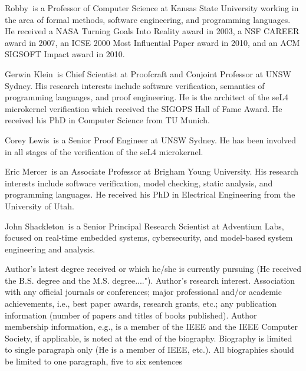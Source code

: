 \begin{IEEEbiography}{Robby}{\,}
is a Professor of Computer Science at Kansas State University working
in the area of formal methods, software engineering, and programming
languages.
He received a NASA Turning Goals Into Reality award in 2003,
a NSF CAREER award in 2007, an ICSE 2000 Most Influential Paper award in 2010,
and an ACM SIGSOFT Impact award in 2010.
\end{IEEEbiography}

\begin{IEEEbiography}{Gerwin Klein}{\,}
is Chief Scientist at Proofcraft and Conjoint Professor at UNSW Sydney. His
research interests include software verification, semantics of programming
languages, and proof engineering. He is the architect of the seL4 microkernel
verification which received the SIGOPS Hall of Fame Award. He received his PhD
in Computer Science from TU Munich.
\end{IEEEbiography}

\begin{IEEEbiography}{Corey Lewis}{\,}%
  is a Senior Proof Engineer at UNSW Sydney. He has been involved in all stages
  of the verification of the seL4 microkernel.
\end{IEEEbiography}

\begin{IEEEbiography}{Eric Mercer}{\,}
  is an Associate Professor at Brigham Young University.
  His research interests include software verification, model checking, static analysis, and programming languages.
  He received his PhD in Electrical Engineering from the University of Utah.
\end{IEEEbiography}

\begin{IEEEbiography}{John Shackleton}{\,}
  is a Senior Principal Research Scientist at Adventium Labs,
  focused on real-time embedded systems, cybersecurity, and
  model-based system engineering and analysis.
\end{IEEEbiography}

Author's latest degree received or which he/she is currently pursuing
(He received the B.S. degree and the M.S. degree...."). Author's
research interest. Association with any official journals or
conferences; major professional and/or academic achievements, i.e.,
best paper awards, research grants, etc.; any publication information
(number of papers and titles of books published). Author membership
information, e.g., is a member of the IEEE and the IEEE Computer
Society, if applicable, is noted at the end of the
biography. Biography is limited to single paragraph only (He is a
member of IEEE, etc.). All biographies should be limited to one
paragraph, five to six sentences
